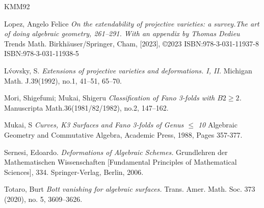 \documentclass[11pt,twoside]{amsart}
\theoremstyle{plain}
\numberwithin{equation}{section}
\theoremstyle{definition}
\begin{document}
\begin{thebibliography}{KMM92}





\color{black}



Lopez, Angelo Felice
\emph{On the extendability of projective varieties: a survey.The art of doing algebraic geometry, 261–291. With an appendix by Thomas Dedieu}
Trends Math. Birkhäuser/Springer, Cham, [2023], ©2023 ISBN:978-3-031-11937-8
ISBN:978-3-031-11938-5



L\'vovsky, S.
\emph{Extensions of projective varieties and deformations. I, II.}
Michigan Math. J.39(1992), no.1, 41–51, 65--70.





Mori, Shigefumi; Mukai, Shigeru
\emph{Classification of Fano 3-folds with $B2 \geq 2$.}
Manuscripta Math.36(1981/82/1982), no.2, 147–162.


Mukai, S
\emph{Curves, K3 Surfaces and Fano 3-folds of Genus $\leq$ 10}
Algebraic Geometry and Commutative Algebra, Academic Press,
1988, Pages 357-377.

  \color{black}
  


  \color{black}








Sernesi, Edoardo.
\emph{Deformations of Algebraic Schemes.}
Grundlehren der Mathematischen Wissenschaften [Fundamental Principles of Mathematical Sciences], 334. Springer-Verlag, Berlin, 2006.

Totaro, Burt
\emph{Bott vanishing for algebraic surfaces.}
Trans. Amer. Math. Soc. 373 (2020), no. 5, 3609–3626.


\end{thebibliography}
\end{document}
